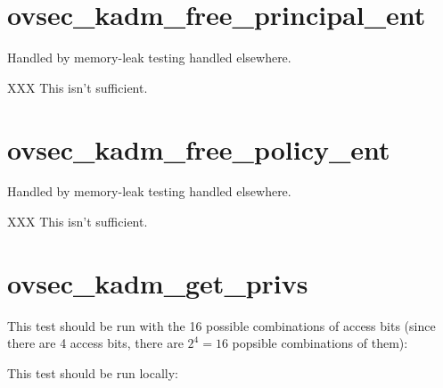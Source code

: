 




\section{ovsec_kadm_free_principal_ent}

Handled by memory-leak testing handled elsewhere.

XXX This isn't sufficient.


\section{ovsec_kadm_free_policy_ent}

Handled by memory-leak testing handled elsewhere.

XXX This isn't sufficient.


\section{ovsec_kadm_get_privs}


This test should be run with the 16 possible combinations of access
bits (since there are 4 access bits, there are $2^4 = 16$ popsible
combinations of them):


This test should be run locally:



